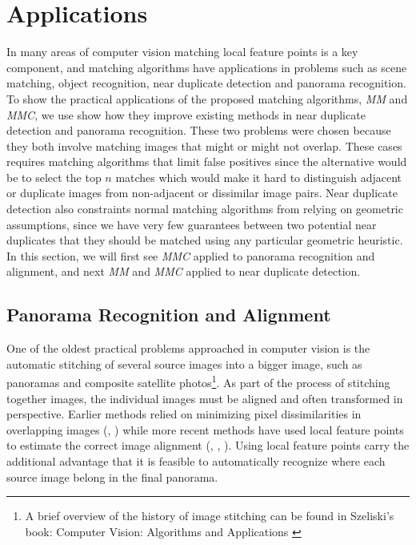 \chapter{Applications}
\label{C:Applications}

In many areas of computer vision matching local feature points is a key 
component, and matching algorithms have applications in problems such as
scene matching, object recognition, near duplicate detection and 
panorama recognition. To show the practical applications of the proposed 
matching algorithms, \emph{MM} and \emph{MMC}, we use show how they 
improve existing methods in near duplicate detection and panorama 
recognition. These two problems were chosen because they both involve 
matching images that might or might not overlap. These cases requires 
matching algorithms that limit false positives since the alternative 
would be to select the top $n$ matches which would make it hard to 
distinguish adjacent or duplicate images from non-adjacent or dissimilar
image pairs. Near duplicate detection also constraints normal matching 
algorithms from relying on geometric assumptions, since we have very few
guarantees between two potential near duplicates that they should be 
matched using any particular geometric heuristic. In this section, we 
will first see \emph{MMC} applied to panorama recognition and alignment,
and next \emph{MM} and \emph{MMC} applied to near duplicate detection.


\section{Panorama Recognition and Alignment}
One of the oldest practical problems approached in computer vision is 
the automatic stitching of several source images into a bigger image, 
such as panoramas and composite satellite photos\footnote{A brief 
overview of the history of image stitching can be found in Szeliski's 
book: Computer Vision: Algorithms and Applications \cite{szeliski2010}}.  
As part of the process of stitching together images, the individual 
images must be aligned and often transformed in perspective. Earlier 
methods relied on minimizing pixel dissimilarities in overlapping images
(\cite{shum1997panoramic}, \cite{szeliski1995direct}) while more recent 
methods have used local feature points to estimate the correct image 
alignment (\cite{mclauchlan2002image}, \cite{capel1998automated}, 
\cite{brown2007automatic}).  Using local feature points carry the 
additional advantage that it is feasible to automatically recognize 
where each source image belong in the final panorama.

